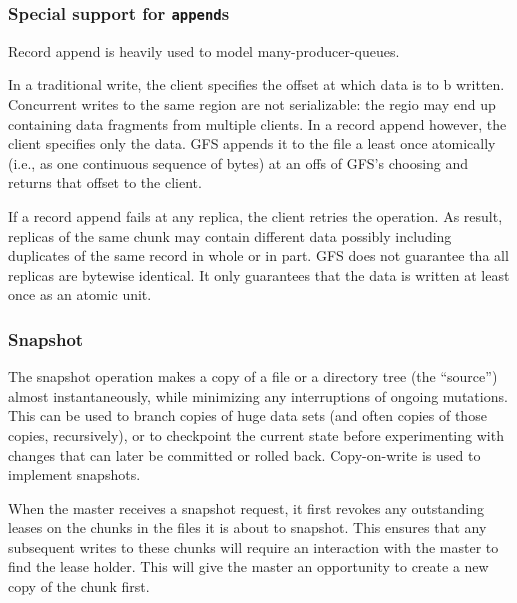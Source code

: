 \documentclass{article}
\begin{document}
\subsubsection{Special support for \texttt{append}s}

Record append is heavily used to model many-producer-queues. 

In a traditional write, the client specifies the offset at which data is to b written. Concurrent writes to the same region are not serializable: the regio may end up containing data fragments from multiple clients. In a record append however, the client specifies only the data. GFS appends it to the file a least once atomically (i.e., as one continuous sequence of bytes) at an offs of GFS’s choosing and returns that offset to the client. 

If a record append fails at any replica, the client retries the operation. As  result, replicas of the same chunk may contain different data possibly including duplicates of the same record in whole or in part. GFS does not guarantee tha all replicas are bytewise identical. It only guarantees that the data is written at least once as an atomic unit. 

\subsubsection{Snapshot}

The snapshot operation makes a copy of a file or a directory tree (the “source”) almost instantaneously, while minimizing any interruptions of ongoing
mutations. This can be used to branch copies of huge data sets (and often copies of those copies, recursively), or to checkpoint the current state before experimenting with changes that can later be committed or rolled back. Copy-on-write is used to implement snapshots. 

When the master receives a snapshot request, it first revokes any outstanding leases on the chunks in the files it is about to snapshot. This ensures that any subsequent writes to these chunks will require an interaction with the master to find the lease holder. This will give the master an opportunity to create a new copy of the chunk first. 
\end{document}
